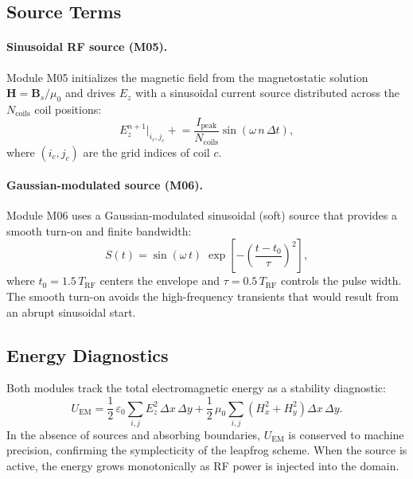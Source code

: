 \documentclass[11pt,a4paper]{report}
\newcommand{\dt}{\Delta t}
\newcommand{\dx}{\Delta x}
\newcommand{\dy}{\Delta y}
\begin{document}
\subsection{Source Terms}

\paragraph{Sinusoidal RF source (M05).}  Module M05 initializes the magnetic field from the magnetostatic solution $\mathbf{H} = \mathbf{B}_s / \mu_0$ and drives $E_z$ with a sinusoidal current source distributed across the $N_\mathrm{coils}$ coil positions:
\begin{equation}
  E_z^{n+1}\big|_{i_c,j_c} \mathrel{+}= \frac{I_\mathrm{peak}}{N_\mathrm{coils}}
  \sin(\omega\,n\,\dt),
  \label{eq:m05-source}
\end{equation}
where $(i_c, j_c)$ are the grid indices of coil $c$.

\paragraph{Gaussian-modulated source (M06).}  Module M06 uses a Gaussian-modulated sinusoidal (soft) source that provides a smooth turn-on and finite bandwidth:
\begin{equation}
  S(t) = \sin(\omega\,t)\;\exp\!\left[-\left(\frac{t - t_0}{\tau}\right)^{\!2}\right],
  \label{eq:m06-source}
\end{equation}
where $t_0 = 1.5\,T_\mathrm{RF}$ centers the envelope and $\tau = 0.5\,T_\mathrm{RF}$ controls the pulse width.  The smooth turn-on avoids the high-frequency transients that would result from an abrupt sinusoidal start.

\subsection{Energy Diagnostics}

Both modules track the total electromagnetic energy as a stability diagnostic:
\begin{equation}
  U_\mathrm{EM} = \frac{1}{2}\,\varepsilon_0 \sum_{i,j} E_z^2\,\dx\,\dy
              + \frac{1}{2}\,\mu_0 \sum_{i,j}\!\left(H_x^2 + H_y^2\right)\dx\,\dy.
  \label{eq:fdtd-energy}
\end{equation}
In the absence of sources and absorbing boundaries, $U_\mathrm{EM}$ is conserved to machine precision, confirming the symplecticity of the leapfrog scheme.  When the source is active, the energy grows monotonically as RF power is injected into the domain.
\end{document}
